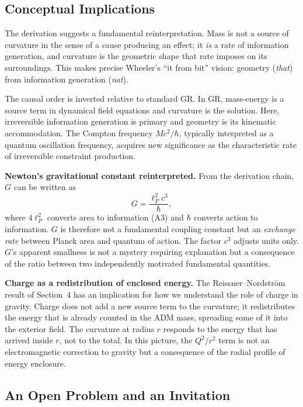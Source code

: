 \documentclass[12pt]{article}
\begin{document}
\subsection{Conceptual Implications}
\label{sec:implications}

The derivation suggests a fundamental reinterpretation.
Mass is not a source of curvature in the sense of a cause producing an
effect; it \emph{is} a rate of information generation, and curvature
is the geometric shape that rate imposes on its surroundings.
This makes precise Wheeler's \cite{Wheeler1990} ``it from bit'' vision:
geometry (\emph{that}) from information generation (\emph{nat}).

The causal order is inverted relative to standard GR\@.
In GR, mass-energy is a source term in dynamical field equations and
curvature is the solution.
Here, irreversible information generation is primary and geometry is
its kinematic accommodation.
The Compton frequency $Mc^2/\hbar$, typically interpreted as a quantum
oscillation frequency, acquires new significance as the characteristic
rate of irreversible constraint production.

\medskip
\noindent\textbf{Newton's gravitational constant reinterpreted.}
From the derivation chain, $G$ can be written as
\begin{equation*}
  G = \frac{\ell_P^2 c^3}{\hbar},
\end{equation*}
where $4\ell_P^2$ converts area to information (A3) and $\hbar$
converts action to information.
$G$ is therefore not a fundamental coupling constant but an
\emph{exchange rate} between Planck area and quantum of action.
The factor $c^3$ adjusts units only.
$G$'s apparent smallness is not a mystery requiring explanation but
a consequence of the ratio between two independently motivated
fundamental quantities.

\medskip
\noindent\textbf{Charge as a redistribution of enclosed energy.}
The Reissner--Nordstr\"om result of Section~4 has an implication
for how we understand the role of charge in gravity.
Charge does not add a new source term to the curvature; it redistributes
the energy that is already counted in the ADM mass, spreading some of
it into the exterior field.
The curvature at radius $r$ responds to the energy that has arrived
inside $r$, not to the total.
In this picture, the $Q^2/r^2$ term is not an electromagnetic
correction to gravity but a consequence of the radial profile of energy
enclosure.

\subsection{An Open Problem and an Invitation}
\end{document}
